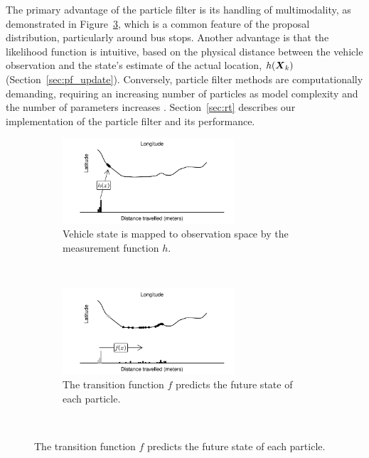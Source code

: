 The primary advantage of the particle filter is its handling of multimodality,
as demonstrated in Figure~\ref{fig:pf_state_predict},
which is a common feature of the proposal distribution, particularly around bus stops.
Another advantage is that the likelihood function is intuitive, based
on the physical distance between the vehicle observation and the state's
estimate of the actual location, $h(\mbox{$\boldsymbol{X}$}_k)$ (Section~\ref{sec:pf_update}).
Conversely, particle filter methods are computationally demanding,
requiring an increasing number of particles as model complexity and
the number of parameters increases \citep{Carpenter_1999}.
Section~\ref{sec:rt} describes our implementation of the particle filter
and its \rt performance.

\begin{figure}[p]
    \centering
    \begin{subfigure}[t]{1\textwidth}
        \centering
        \includegraphics[width=0.7\textwidth]{figures/03_particle_filter_1.pdf}
        \caption{
            Vehicle state is mapped to observation space by the
            measurement function $h$.
        }
        \label{fig:pf_state_prev}
    \end{subfigure}\\
    \begin{subfigure}[t]{0.9\textwidth}
        \centering
        \includegraphics[width=0.7\textwidth]{figures/03_particle_filter_2.pdf}
        \caption{
            The transition function $f$ predicts the future state
            of each particle.
        }
        \label{fig:pf_state_predict}
    \end{subfigure}\\

\end{figure}
